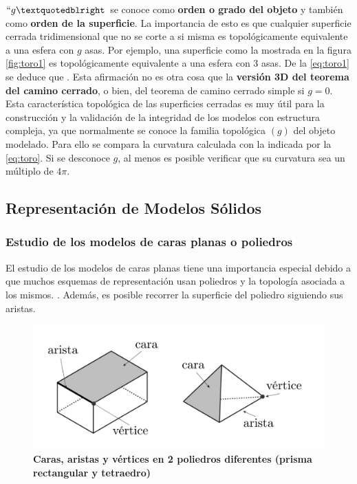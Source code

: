 $``g”$ se conoce como \textbf{orden o grado del objeto} y también como \textbf{orden de la superficie}.
La importancia de esto es que cualquier superficie cerrada tridimensional que no se corte a si misma es topológicamente equivalente a una esfera con $g$ asas. Por ejemplo, una superficie como la mostrada en la figura \ref{fig:toro1}
es topológicamente equivalente a una esfera con 3 asas.
De la \ref{eq:toro1} se deduce que . Esta afirmación no es otra cosa que la \textbf{versión 3D del teorema del camino cerrado}, o bien, del teorema de camino cerrado simple si $g = 0$. Esta característica topológica de las superficies cerradas es muy útil para la construcción y la validación de la integridad de los modelos con estructura compleja, ya que normalmente se conoce la familia topológica $(g)$ del objeto modelado. Para ello se compara la curvatura
calculada con la indicada por la \ref{eq:toro}. Si se desconoce $g$, al menos es posible verificar que su curvatura sea un múltiplo de $4\pi$.

\subsection{Representación de Modelos Sólidos}

\subsubsection{Estudio de los modelos de caras planas o poliedros }
\label{sectionpoliedro}

El estudio de los modelos de caras planas tiene una importancia especial debido a que muchos esquemas de representación usan poliedros y la topología asociada a los mismos.
 \citep{Ramos2011}. Además, es posible recorrer la superficie del poliedro siguiendo sus aristas.

\begin{figure}[h]
\includegraphics[width=12cm]{Img/GEO/geo-vertex.jpg}
\centering
\caption{\textbf{\footnotesize{Caras, aristas y vértices en 2 poliedros diferentes (prisma rectangular y tetraedro)}}}
\end{figure}


